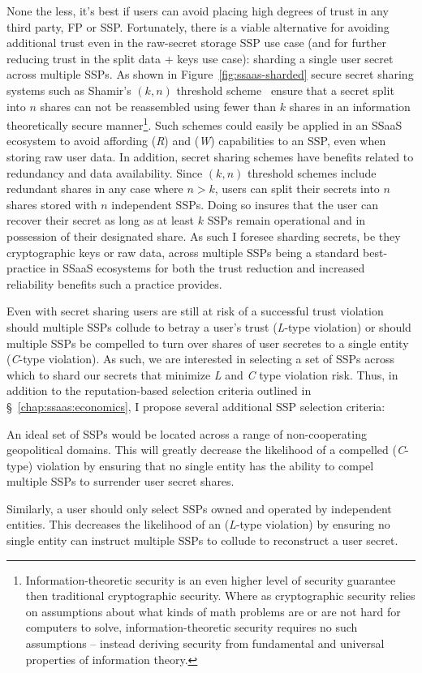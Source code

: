 None the less, it's best if users can avoid placing high degrees of
trust in any third party, FP or SSP. Fortunately, there is a viable
alternative for avoiding additional trust even in the raw-secret
storage SSP use case (and for further reducing trust in the split data
+ keys use case): sharding a single user secret across multiple
SSPs. As shown in Figure~\ref{fig:ssaas-sharded} secure secret sharing
systems such as Shamir's $(k, n)$ threshold scheme~\cite{shamir1979}
ensure that a secret split into $n$ shares can not be reassembled
using fewer than $k$ shares in an information theoretically secure
manner\footnote{Information-theoretic security is an even higher level
  of security guarantee then traditional cryptographic security. Where
  as cryptographic security relies on assumptions about what kinds of
  math problems are or are not hard for computers to solve,
  information-theoretic security requires no such assumptions --
  instead deriving security from fundamental and universal properties
  of information theory.}. Such schemes could easily be applied in an
SSaaS ecosystem to avoid affording (\emph{R}) and (\emph{W})
capabilities to an SSP, even when storing raw user data. In addition,
secret sharing schemes have benefits related to redundancy and data
availability. Since $(k, n)$ threshold schemes include redundant
shares in any case where $n > k$, users can split their secrets into
$n$ shares stored with $n$ independent SSPs. Doing so insures that the
user can recover their secret as long as at least $k$ SSPs remain
operational and in possession of their designated share. As such I
foresee sharding secrets, be they cryptographic keys or raw data,
across multiple SSPs being a standard best-practice in SSaaS
ecosystems for both the trust reduction and increased reliability
benefits such a practice provides.

Even with secret sharing users are still at risk of a successful trust
violation should multiple SSPs collude to betray a user's trust
(\emph{L}-type violation) or should multiple SSPs be compelled to turn
over shares of user secretes to a single entity (\emph{C}-type
violation). As such, we are interested in selecting a set of SSPs
across which to shard our secrets that minimize \emph{L} and \emph{C}
type violation risk. Thus, in addition to the reputation-based
selection criteria outlined in \S~\ref{chap:ssaas:economics}, I
propose several additional SSP selection criteria:

\begin{packed_desc}
\item[Geopolitical Diversity:] An ideal set of SSPs would be located
  across a range of non-cooperating geopolitical domains. This will
  greatly decrease the likelihood of a compelled (\emph{C}-type)
  violation by ensuring that no single entity has the ability to
  compel multiple SSPs to surrender user secret shares.
\item[Ownership Diversity:] Similarly, a user should only select SSPs
  owned and operated by independent entities. This decreases the
  likelihood of an (\emph{L}-type violation) by ensuring no single
  entity can instruct multiple SSPs to collude to reconstruct a user
  secret.
\end{packed_desc}

